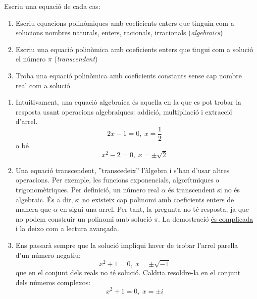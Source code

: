 \Exercise Escriu una equació de cada cas:
\begin{enumerate}
    \item Escriu equacions polinòmiques amb coeficients enters que tinguin com a solucions nombres naturals, enters, racionals, irracionals (\textit{algebraics})
    \item Escriu una equació polinòmica amb coeficients enters que tingui com a solució el número $\pi$ (\textit{transcendent})
    \item Troba una equació polinòmica amb coeficients constants sense cap nombre real com a  solució
\end{enumerate}

\Answer 
\begin{enumerate}
  \item Intuitivament, una equació algebraica és aquella en la que es pot trobar la resposta usant operacions algebraiques: addició, multipliació i extracció d'arrel.
  \[2x-1=0, \; x=\frac{1}{2}\]
  o bé
  \[x^2-2=0, \; x=\pm\sqrt{2}\]
  \item Una equació transcendent, ''transcedeix'' l'àlgebra i s'han d'usar altres operacions. Per exemple, les funcions exponencials, algorítmiques o trigonomètriques. Per definició, un número real $\alpha$ és transcendent si no és algebraic. És a dir, si no existeix cap polinomi amb coeficients enters de manera que $\alpha$ en sigui una arrel. Per tant, la pregunta no té resposta, ja que no podem construir un polinomi amb solució $\pi$. La demostració \href{https://www.gaussianos.com/como-demostrar-que-%CF%80-pi-es-trascendente/}{és complicada} i la deixo com a lectura avançada.
  \item Ens passarà sempre que la solució impliqui haver de trobar l'arrel parella d'un número negatiu:
  \[x^2+1=0, \; x=\pm\sqrt{-1}\]
  que en el conjunt dels reals no té solució. Caldria resoldre-la en el conjunt dels números complexos:
  \[x^2+1=0, \; x=\pm i\]
\end{enumerate}
\blacksquare
